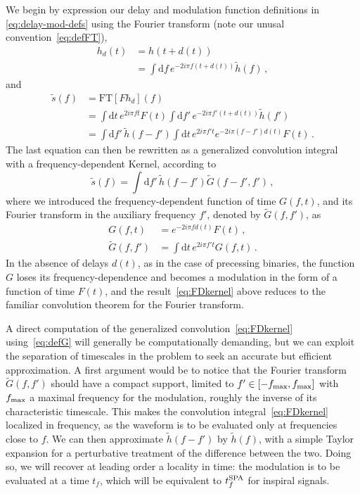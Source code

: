 \documentclass[aps,showpacs,twocolumn,
prd,superscriptaddress,nofootinbib]{revtex4-1}
\newcommand{\be}{\begin{equation}}
\newcommand{\ee}{\end{equation}}
\newcommand\ud{{\mathrm{d}}}
\newcommand{\nn}{\nonumber}
\newcommand{\tf}{t_{f}}
\newcommand{\tfSPA}{t_{f}^{\rm SPA}}
\begin{document}
We begin by expression our delay and modulation function definitions in \eqref{eq:delay-mod-defs} using the Fourier transform (note our unusal convention~\eqref{eq:defFT}),
\begin{align}
h_{d}(t) & =  h(t+d(t)) \nonumber\\
&=\int \ud f \, e^{-2i\pi f (t+d(t))}\tilde{h}(f) \,,
\end{align}
and
\begin{align}
  \tilde{s}(f) &= \mathrm{FT} \left[ F h_{d}\right] (f) \nn \\
  &= \int \ud t \, e^{2i\pi f t} F(t)  \int \ud f' \, e^{-2i\pi f' (t+d(t))}\tilde{h}(f') \nn\\
	&= \int \ud f' \, \tilde{h}(f-f') \int \ud t \, e^{2i\pi f' t} e^{-2i\pi (f-f') d(t)} F(t) \,.
\end{align}
The last equation can then be rewritten as a generalized convolution integral with a frequency-dependent Kernel, according to
\be\label{eq:FDkernel}
	\tilde{s}(f) = \int \ud f' \, \tilde{h}(f-f') \tilde{G}(f-f',f') \,,
\ee
where we introduced the frequency-dependent function of time $G(f,t)$, and its Fourier transform in the auxiliary frequency $f'$, denoted by $\tilde{G}(f,f')$, as
\begin{subequations}\label{eq:defG}
\begin{align}
	G(f,t) &= e^{-2i\pi f d(t)} F(t) \,, \\
	\tilde{G}(f,f') &= \int \ud t \, e^{2i\pi f' t} G(f,t) \,.
\end{align}
\end{subequations}
In the absence of delays $d(t)$, as in the case of precessing binaries, the function $G$ loses its frequency-dependence and becomes a modulation in the form of a function of time $F(t)$, and the result~\eqref{eq:FDkernel} above reduces to the familiar convolution theorem for the Fourier transform.

A direct computation of the generalized convolution~\eqref{eq:FDkernel} using~\eqref{eq:defG} will generally be computationally demanding, but we can exploit the separation of timescales in the problem to seek an accurate but efficient approximation. A first argument would be to notice that the Fourier transform $\tilde{G}(f,f')$ should have a compact support, limited to $f' \in [-f_{\rm max}, f_{\rm max}]$ with $f_{\rm max}$ a maximal frequency for the modulation, roughly the inverse of its characteristic timescale. This makes the convolution integral~\eqref{eq:FDkernel} localized in frequency, as the waveform is to be evaluated only at frequencies close to $f$. We can then approximate $\tilde{h}(f-f')$ by $\tilde{h}(f)$, with a simple Taylor expansion for a perturbative treatment of the difference between the two. Doing so, we will recover at leading order a locality in time: the modulation is to be evaluated at a time $\tf$, which will be equivalent to $\tfSPA$ for inspiral signals.
\end{document}

